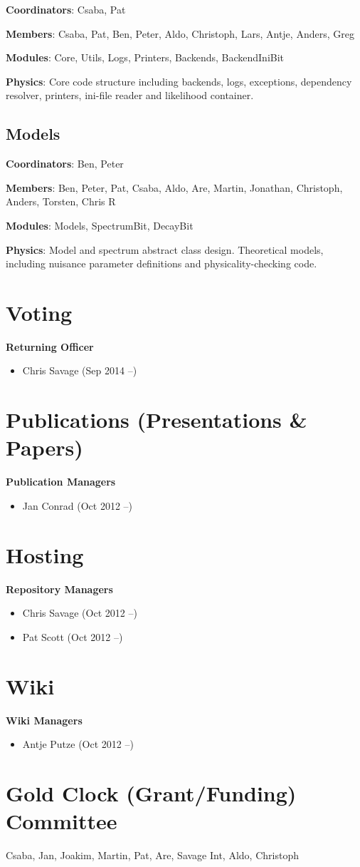 \textbf{Coordinators}: Csaba, Pat

\textbf{Members}: Csaba, Pat, Ben, Peter, Aldo, Christoph, Lars, Antje, Anders, Greg

\textbf{Modules}: Core, Utils, Logs, Printers, Backends, BackendIniBit

\textbf{Physics}: Core code structure including backends, logs, exceptions, dependency resolver, printers, ini-file reader and likelihood container.


\subsection{Models}

\textbf{Coordinators}: Ben, Peter

\textbf{Members}: Ben, Peter, Pat, Csaba, Aldo, Are, Martin, Jonathan, Christoph, Anders, Torsten, Chris R

\textbf{Modules}: Models, SpectrumBit, DecayBit

\textbf{Physics}: Model and spectrum abstract class design. Theoretical models, including nuisance parameter definitions and physicality-checking code.


\section{Voting}

\textbf{Returning Officer}
\begin{itemize}
\item Chris Savage (Sep 2014 --)
\end{itemize}

\section{Publications (Presentations \& Papers)}

\textbf{Publication Managers}
\begin{itemize}
\item Jan Conrad (Oct 2012 --)
\end{itemize}

\section{Hosting}

\textbf{Repository Managers}
\begin{itemize}
\item Chris Savage (Oct 2012 --)
\item Pat Scott (Oct 2012 --)
\end{itemize}

\section{Wiki}

\textbf{Wiki Managers}
\begin{itemize}
\item Antje Putze (Oct 2012 --)
\end{itemize}

\section{Gold Clock (Grant/Funding) Committee}
Csaba, Jan, Joakim, Martin, Pat, Are, Savage Int, Aldo, Christoph


